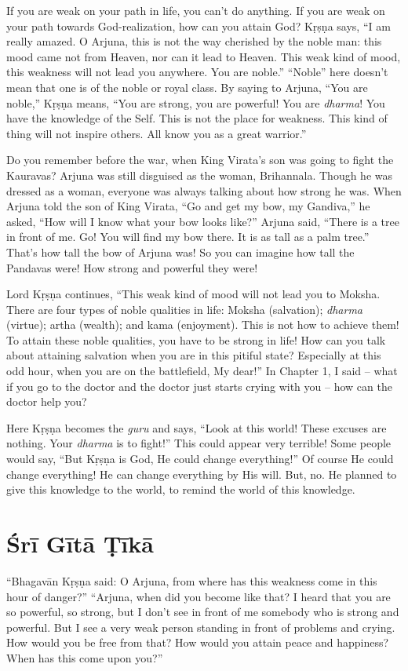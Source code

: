 If you are weak on your path in life, you can’t do anything. If you are weak on your path towards God-realization, how can you attain God? Kṛṣṇa says, “I am really amazed. O Arjuna, this is not the way cherished by the noble man: this mood came not from Heaven, nor can it lead to Heaven. This weak kind of mood, this weakness will not lead you anywhere. You are noble.” “Noble” here doesn’t mean that one is of the noble or royal class. By saying to Arjuna, “You are noble,” Kṛṣṇa means, “You are strong, you are powerful! You are \textit{dharma}! You have the knowledge of the Self. This is not the place for weakness. This kind of thing will not inspire others. All know you as a great warrior.”

Do you remember before the war, when King Virata’s son was going to fight the Kauravas? Arjuna was still disguised as the woman, Brihannala. Though he was dressed as a woman, everyone was always talking about how strong he was. When Arjuna told the son of King Virata, “Go and get my bow, my Gandiva,” he asked, “How will I know what your bow looks like?” Arjuna said, “There is a tree in front of me. Go! You will find my bow there. It is as tall as a palm tree.” That’s how tall the bow of Arjuna was! So you can imagine how tall the Pandavas were! How strong and powerful they were!

Lord Kṛṣṇa continues, “This weak kind of mood will not lead you to Moksha. There are four types of noble qualities in life: Moksha (salvation); \textit{dharma} (virtue); artha (wealth); and kama (enjoyment). This is not how to achieve them! To attain these noble qualities, you have to be strong in life! How can you talk about attaining salvation when you are in this pitiful state? Especially at this odd hour, when you are on the battlefield, My dear!” In Chapter 1, I said -- what if you go to the doctor and the doctor just starts crying with you – how can the doctor help you?

Here Kṛṣṇa becomes the \textit{guru} and says, “Look at this world! These excuses are nothing. Your \textit{dharma} is to fight!” This could appear very terrible! Some people would say, “But Kṛṣṇa is God, He could change everything!” Of course He could change everything! He can change everything by His will. But, no. He planned to give this knowledge to the world, to remind the world of this knowledge.

\section{Śrī Gītā Ṭīkā}
“Bhagavān Kṛṣṇa said: O Arjuna, from where has this weakness come in this hour of danger?” “Arjuna, when did you become like that? I heard that you are so powerful, so strong, but I don’t see in front of me somebody who is strong and powerful. But I see a very weak person standing in front of problems and crying. How would you be free from that? How would you attain peace and happiness? When has this come upon you?”

